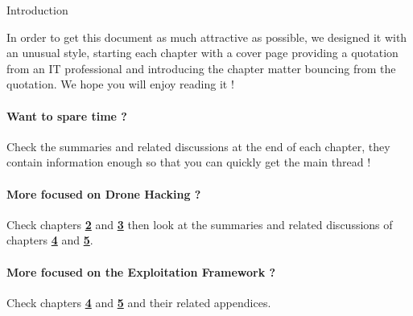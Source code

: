 \begin{chaptercover}{Introduction}
\begin{tip}
In order to get this document as much attractive as possible, we designed it with an unusual style, starting each chapter with a cover page providing a quotation from an IT professional and introducing the chapter matter bouncing from the quotation. We hope you will enjoy reading it !

\paragraph{Want to spare time ?} \hfill

Check the summaries and related discussions at the end of each chapter, they contain information enough so that you can quickly get the main thread !

\paragraph{More focused on Drone Hacking ?} \hfill

Check chapters \hyperref[background]{\color{FirstBlue}\bfseries 2} and \hyperref[scope]{\color{FirstBlue}\bfseries 3} then look at the summaries and related discussions of chapters \hyperref[exploits]{\color{FirstBlue}\bfseries 4} and \hyperref[framework]{\color{FirstBlue}\bfseries 5}.

\paragraph{More focused on the Exploitation Framework ?} \hfill

Check chapters \hyperref[exploits]{\color{FirstBlue}\bfseries 4} and \hyperref[framework]{\color{FirstBlue}\bfseries 5} and their related appendices.
\end{tip}

\end{chaptercover}
